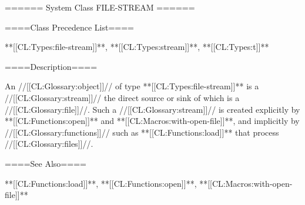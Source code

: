 ====== System Class FILE-STREAM ======

====Class Precedence List====

**[[CL:Types:file-stream]]**, **[[CL:Types:stream]]**, **[[CL:Types:t]]**

====Description====

An //[[CL:Glossary:object]]// of type **[[CL:Types:file-stream]]** is a //[[CL:Glossary:stream]]// the direct source or sink of which is a //[[CL:Glossary:file]]//. Such a //[[CL:Glossary:stream]]// is created explicitly by **[[CL:Functions:open]]** and **[[CL:Macros:with-open-file]]**, and implicitly by //[[CL:Glossary:functions]]// such as **[[CL:Functions:load]]** that process //[[CL:Glossary:files]]//.

====See Also====

**[[CL:Functions:load]]**, **[[CL:Functions:open]]**, **[[CL:Macros:with-open-file]]**

 
